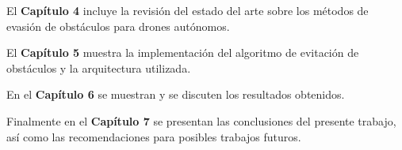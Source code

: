     \par El \textbf{Capítulo 4} incluye la revisión del estado del arte sobre los métodos de evasión de obstáculos para drones autónomos. 
 
    \par El \textbf{Capítulo 5} muestra la implementación del algoritmo de evitación de obstáculos y la arquitectura utilizada.
    
    \par En el \textbf{Capítulo 6} se muestran y se discuten los resultados obtenidos.
    
    \par Finalmente en el \textbf{Capítulo 7} se presentan las conclusiones del presente trabajo, así como las recomendaciones para posibles trabajos futuros. 
